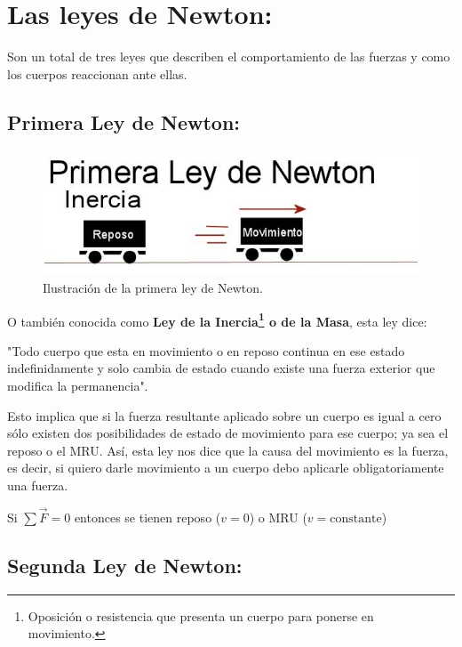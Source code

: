\documentclass[a5paper,pagesize,10pt,bibtotoc,pointlessnumbers,
normalheadings,DIV=9,fleqn,x11names,table,twoside=false]{scrbook}
\begin{document}
\section{Las leyes de Newton:}

Son un total de tres leyes que describen el comportamiento de las fuerzas y como los cuerpos reaccionan ante ellas.

\subsection{Primera Ley de Newton:}

\begin{figure}[ht]
 \centering
 \includegraphics[scale=0.5]{images/primera-ley-de-newton.jpg}
 \caption{Ilustración de la primera ley de Newton.}\label{ac}
\end{figure} 

O también conocida como \textbf{Ley de la Inercia\footnote{Oposición o resistencia que presenta un cuerpo para ponerse 
en movimiento.} o de la Masa}, esta ley dice:

\begin{tcolorbox}
"Todo cuerpo que esta en movimiento o en reposo continua en ese estado indefinidamente y solo cambia de estado cuando existe una 
fuerza exterior que modifica la permanencia".
\end{tcolorbox}

Esto implica que si la fuerza resultante aplicado sobre un cuerpo es igual a cero sólo existen dos posibilidades de estado de 
movimiento para ese cuerpo; ya sea el reposo o el MRU. Así, esta ley nos dice que la causa del movimiento es la fuerza, es decir, 
si quiero darle movimiento a un cuerpo debo aplicarle obligatoriamente una fuerza.

\begin{tcolorbox}
Si $\sum \vec{F} = 0$ entonces se tienen reposo ($v = 0$) o MRU ($v =  \text{constante}$)
\end{tcolorbox}

\subsection{Segunda Ley de Newton:}
\end{document}
